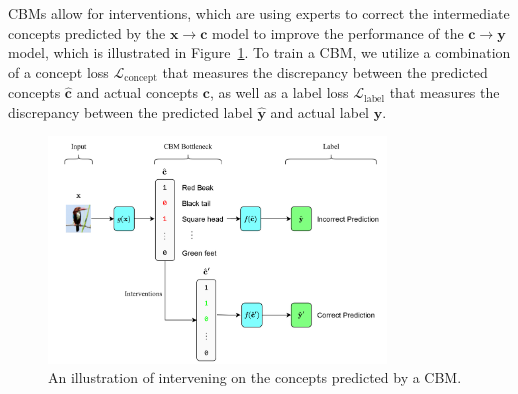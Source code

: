 CBMs allow for interventions, which are using experts to correct the intermediate concepts
predicted by the $\mathbf{x} \to \mathbf{c}$ model to improve the performance of the $\mathbf{c} \to \mathbf{y}$ model,
which is illustrated in Figure~\ref{fig:cbm-interventions}.
To train a CBM, we utilize a combination of 
a concept loss $\mathcal{L}_{\text{concept}}$ that measures the
discrepancy between the predicted concepts $\hat{\mathbf{c}}$ 
and actual concepts $\mathbf{c}$, as well as a label loss $\mathcal{L}_{\text{label}}$
that measures the discrepancy between the predicted label $\hat{\mathbf{y}}$
and actual label $\mathbf{y}$.

\begin{figure}[!ht]
    \centering
    \includegraphics[width=0.8\textwidth]{figs/background/cbm_interventions.png}
    \caption{An illustration of intervening on the concepts predicted by a CBM.}
    \label{fig:cbm-interventions}
\end{figure}



    
